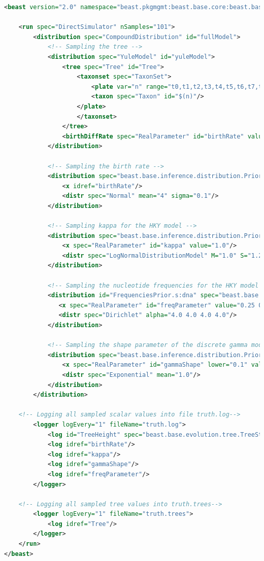 \documentclass[oneside]{article}
\begin{document}
{\scriptsize
\begin{lstlisting}[language=XML, breaklines=true, backgroundcolor=\color{light-gray}]
<beast version="2.0" namespace="beast.pkgmgmt:beast.base.core:beast.base.inference:beast.base.evolution.alignment:beast.base.evolution.tree :beast.base.evolution.speciation:beast.base.inference.distribution:beast.base.inference.util :beast.base.inference.parameter">

    <run spec="DirectSimulator" nSamples="101">
        <distribution spec="CompoundDistribution" id="fullModel">
            <!-- Sampling the tree -->
            <distribution spec="YuleModel" id="yuleModel">
                <tree spec="Tree" id="Tree">
                    <taxonset spec="TaxonSet">
                        <plate var="n" range="t0,t1,t2,t3,t4,t5,t6,t7,t8,t9">
	                    <taxon spec="Taxon" id="$(n)"/>
	                </plate>
                    </taxonset>
                </tree>
                <birthDiffRate spec="RealParameter" id="birthRate" value="1.0"/>
            </distribution>

            <!-- Sampling the birth rate -->
            <distribution spec="beast.base.inference.distribution.Prior" id="birthDiffRatePrior">
                <x idref="birthRate"/>
                <distr spec="Normal" mean="4" sigma="0.1"/>
            </distribution>

            <!-- Sampling kappa for the HKY model -->
            <distribution spec="beast.base.inference.distribution.Prior" id="kappaPrior">
                <x spec="RealParameter" id="kappa" value="1.0"/>
                <distr spec="LogNormalDistributionModel" M="1.0" S="1.25"/>
            </distribution>

            <!-- Sampling the nucleotide frequencies for the HKY model -->
            <distribution id="FrequenciesPrior.s:dna" spec="beast.base.inference.distribution.Prior" >
               <x spec="RealParameter" id="freqParameter" value="0.25 0.25 0.25 0.25"/>
               <distr spec="Dirichlet" alpha="4.0 4.0 4.0 4.0"/>
            </distribution>

            <!-- Sampling the shape parameter of the discrete gamma model for rate heterogeneity -->
            <distribution spec="beast.base.inference.distribution.Prior" id="GammaShapePrior.s:dna">
                <x spec="RealParameter" id="gammaShape" lower="0.1" value="1.0"/>
            	<distr spec="Exponential" mean="1.0"/>
    	    </distribution>
        </distribution>

	<!-- Logging all sampled scalar values into file truth.log-->
        <logger logEvery="1" fileName="truth.log">
            <log id="TreeHeight" spec="beast.base.evolution.tree.TreeStatLogger" tree="@Tree"/>
            <log idref="birthRate"/>
            <log idref="kappa"/>
            <log idref="gammaShape"/>
            <log idref="freqParameter"/>
        </logger>

	<!-- Logging all sampled tree values into truth.trees-->
        <logger logEvery="1" fileName="truth.trees">
            <log idref="Tree"/>
        </logger>
    </run>
</beast>
\end{lstlisting}
}
\end{document}
